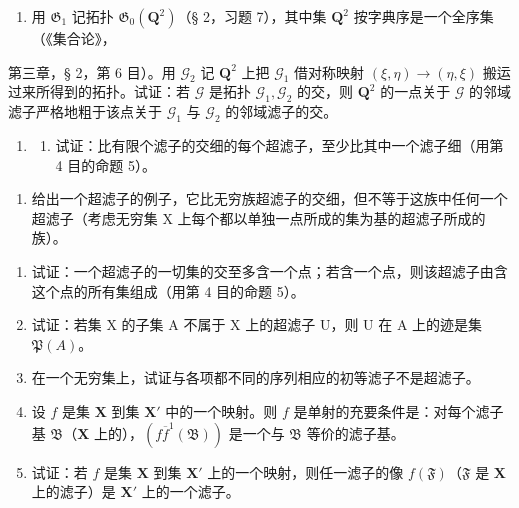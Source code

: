 \begin{enumerate}
\def\labelenumi{\alph{enumi})}
\setcounter{enumi}{1}
\tightlist
\item
  用 \(\mathfrak{G}_1\) 记拓扑 \(\mathfrak{G}_0(\mathbf{Q}^2)\)（§ 2，习题 7），其中集 \(\mathbf{Q}^2\) 按字典序是一个全序集（《集合论》，
\end{enumerate}

第三章，§ 2，第 6 目）。用 \(\mathcal{G}_2\) 记 \(\mathbf{Q}^2\) 上把 \(\mathcal{G}_1\) 借对称映射 \((\xi, \eta) \to (\eta, \xi)\) 搬运过来所得到的拓扑。试证：若 \(\mathcal{G}\) 是拓扑 \(\mathcal{G}_1, \mathcal{G}_2\) 的交，则 \(\mathbf{Q}^2\) 的一点关于 \(\mathcal{G}\) 的邻域滤子严格地粗于该点关于 \(\mathcal{G}_1\) 与 \(\mathcal{G}_2\) 的邻域滤子的交。

\begin{enumerate}
\def\labelenumi{\arabic{enumi})}
\setcounter{enumi}{8}
\tightlist
\item
  \begin{enumerate}
  \def\labelenumii{\alph{enumii})}
  \tightlist
  \item
    试证：比有限个滤子的交细的每个超滤子，至少比其中一个滤子细（用第 4 目的命题 5）。
  \end{enumerate}
\end{enumerate}

\begin{enumerate}
\def\labelenumi{\alph{enumi})}
\setcounter{enumi}{1}
\tightlist
\item
  给出一个超滤子的例子，它比无穷族超滤子的交细，但不等于这族中任何一个超滤子（考虑无穷集 X 上每个都以单独一点所成的集为基的超滤子所成的族）。
\end{enumerate}

\begin{enumerate}
\def\labelenumi{\arabic{enumi})}
\setcounter{enumi}{9}
\item
  试证：一个超滤子的一切集的交至多含一个点；若含一个点，则该超滤子由含这个点的所有集组成（用第 4 目的命题 5）。
\item
  试证：若集 X 的子集 A 不属于 X 上的超滤子 U，则 U 在 A 上的迹是集 \(\mathfrak{P}(A)\)。
\item
  在一个无穷集上，试证与各项都不同的序列相应的初等滤子不是超滤子。
\item
  设 \(f\) 是集 \(\mathbf{X}\) 到集 \(\mathbf{X}'\) 中的一个映射。则 \(f\) 是单射的充要条件是：对每个滤子基 \(\mathfrak{B}\)（\(\mathbf{X}\) 上的），\((f\overline{f}^{1}(\mathfrak{B}))\) 是一个与 \(\mathfrak{B}\) 等价的滤子基。
\item
  试证：若 \(f\) 是集 \(\mathbf{X}\) 到集 \(\mathbf{X}'\) 上的一个映射，则任一滤子的像 \(f(\mathfrak{F})\)（\(\mathfrak{F}\) 是 \(\mathbf{X}\) 上的滤子）是 \(\mathbf{X}'\) 上的一个滤子。
\end{enumerate}

